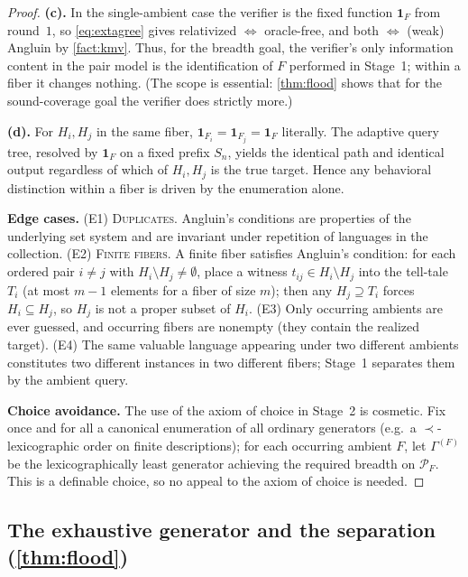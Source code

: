 \documentclass[11pt]{article}
\numberwithin{equation}{section}
\newcommand{\mc}[1]{\mathcal{#1}}
\newcommand{\Amb}{F}
\newcommand{\Val}{H}
\newcommand{\Pairs}{\mc{P}}
\newcommand{\Seen}{S}
\newcommand{\fiber}[1]{\Pairs_{#1}}
\theoremstyle{plain}
\theoremstyle{definition}
\theoremstyle{remark}
\begin{document}
\begin{proof}
\medskip\noindent\textbf{(c).}\quad
In the single-ambient case the verifier is the fixed function $\mathbf 1_{\Amb}$ from
round~$1$, so \eqref{eq:extagree} gives relativized $\iff$ oracle-free, and both $\iff$ (weak)
Angluin by \cref{fact:kmv}. Thus, for the breadth goal, the verifier's only information
content in the pair model is the identification of $\Amb$ performed in Stage~1; within a fiber
it changes nothing. (The scope is essential: \cref{thm:flood} shows that for the
sound-coverage goal the verifier does strictly more.)

\medskip\noindent\textbf{(d).}\quad
For $\Val_i, \Val_j$ in the same fiber, $\mathbf 1_{\Amb_i} = \mathbf 1_{\Amb_j} = \mathbf
1_{\Amb}$ literally. The adaptive query tree, resolved by $\mathbf 1_{\Amb}$ on a fixed prefix
$\Seen_n$, yields the identical path and identical output regardless of which of $\Val_i,
\Val_j$ is the true target. Hence any behavioral distinction within a fiber is driven by the
enumeration alone.

\medskip\noindent\textbf{Edge cases.}\quad
\textsc{(E1) Duplicates.} Angluin's conditions are properties of the underlying set system and
are invariant under repetition of languages in the collection. \textsc{(E2) Finite fibers.} A
finite fiber satisfies Angluin's condition: for each ordered pair $i \ne j$ with $\Val_i
\setminus \Val_j \ne \emptyset$, place a witness $t_{ij} \in \Val_i \setminus \Val_j$ into the
tell-tale $T_i$ (at most $m-1$ elements for a fiber of size $m$); then any $\Val_j \supseteq
T_i$ forces $\Val_i \subseteq \Val_j$, so $\Val_j$ is not a proper subset of $\Val_i$.
\textsc{(E3)} Only occurring ambients are ever guessed, and occurring fibers are nonempty
(they contain the realized target). \textsc{(E4)} The same valuable language appearing under
two different ambients constitutes two different instances in two different fibers; Stage~1
separates them by the ambient query.

\medskip\noindent\textbf{Choice avoidance.}\quad
The use of the axiom of choice in Stage~2 is cosmetic. Fix once and for all a canonical
enumeration of all ordinary generators (e.g.\ a $\prec$-lexicographic order on finite
descriptions); for each occurring ambient $\Amb$, let $\Gamma^{(\Amb)}$ be the
lexicographically least generator achieving the required breadth on $\fiber{\Amb}$. This is a
definable choice, so no appeal to the axiom of choice is needed.
\end{proof}

\subsection{The exhaustive generator and the separation (\texorpdfstring{\cref{thm:flood}}{Theorem 2})}
\label{app:flood}
\end{document}
